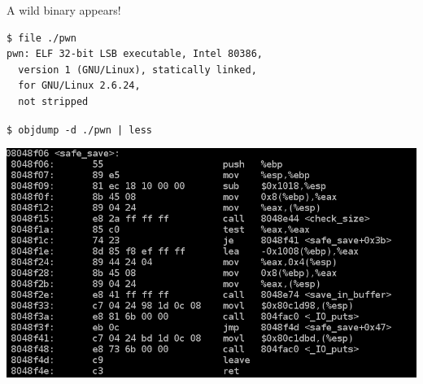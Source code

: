 \begin{frame}

  {\Huge A wild binary appears!}
  \vspace{1em}

  \begin{lstlisting}
$ file ./pwn
pwn: ELF 32-bit LSB executable, Intel 80386,
  version 1 (GNU/Linux), statically linked,
  for GNU/Linux 2.6.24,
  not stripped
  \end{lstlisting}

\end{frame}


\begin{frame}

  \huge
  \begin{center}
    \verb+$ objdump -d ./pwn | less+
  \end{center}
\end{frame}

{
\begin{frame}
  \begin{center}
    \includegraphics[width=\textwidth]{./images/objdump.png}
  \end{center}
\end{frame}
}


